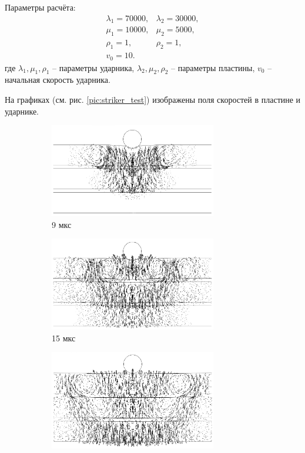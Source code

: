 Параметры расчёта:
\begin{eqnarray}
\lambda_1=70000, & \lambda_2=30000, \\
\mu_1=10000, & \mu_2=5000, \\
\rho_1=1, & \rho_2=1, \\
v_0 = 10. &
\end{eqnarray}
где $\lambda_1, \mu_1, \rho_1$ -- параметры ударника, $\lambda_2, \mu_2, \rho_2$ -- параметры пластины, $v_0$ -- начальная скорость ударника.

На графиках (см. рис. \ref{pic:striker_test}) изображены поля скоростей в пластине и ударнике.

\clearpage
\newpage


\begin{figure}[ht]
\begin{subfigure}[b]{\textwidth}
\centering
\includegraphics[width=0.8\textwidth]{png/stounly-wave/01.png}
\caption{9 мкс}
\end{subfigure}
\begin{subfigure}[b]{\textwidth}
\centering
\includegraphics[width=0.8\textwidth]{png/stounly-wave/02.png}
\caption{15 мкс}
\end{subfigure}
\begin{subfigure}[b]{\textwidth}
\centering
\includegraphics[width=0.8\textwidth]{png/stounly-wave/03.png}

\end{subfigure}
\end{figure}
